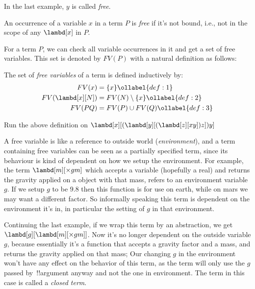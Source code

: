\documentclass[../../../include/open-logic-section]{subfiles}
\begin{document}
In the last example, $y$ is called \emph{free}. 
\begin{defn}
  An occurrence of a variable $x$ in a term $P$ is \emph{free} if it's not bound, i.e., not in the scope of any
  $\lambd[x]$ in $P$.
\end{defn}


For a term $P$, we can check all variable occurrences in it and get a set of free
variables. This set is denoted by $FV(P)$ with a natural definition
as follows:

\begin{defn} 
  The set of \emph{free variables} of a term is defined inductively by:
  \begin{align} 
    FV(x) &= \{x\} \ollabel{def:1} \\
    FV(\lambd[x][N]) &= FV(N) \setminus \{x\}    \ollabel{def:2} \\
    FV(PQ) &= FV(P) \cup FV(Q) \ollabel{def:3}
  \end{align}
\end{defn}

\begin{prob}
  Run the above definition on $\lambd[x][(\lambd[y][(\lambd[z][x y]) z]) y]$
\end{prob}

\begin{explain}
A free variable is like a reference to outside world (\emph{environment}), and a term
containing free variables can be seen as a partially specified term,
since its behaviour is kind of dependent on how we setup the
environment. For example, the term $\lambd[m][\times g m]$ which
accepts a variable (hopefully a real) and returns the gravity applied
on a object with that mass, refers to an environment variable $g$. If we
setup $g$ to be $9.8$  then this function is for use on earth,
while on mars we may want a different factor.
So informally speaking this term is dependent on the environment
it's in, in particular the setting of $g$ in that environment.

Continuing the last example, if we wrap this term by an abstraction, we get
$\lambd[g][\lambd[m][\times g m]]$. Now it's no longer dependent on
the outside variable $g$, because essentially it's a function that
accepts a gravity factor and a mass, and returns the gravity applied
on that mass; Our changing $g$ in the environment won't have any
effect on the behavior of this term, as the term will only use the $g$
passed by~!!{argument} anyway and not the one in environment. The term
in this case is called a \emph{closed term}.
\end{explain}
\end{document}
